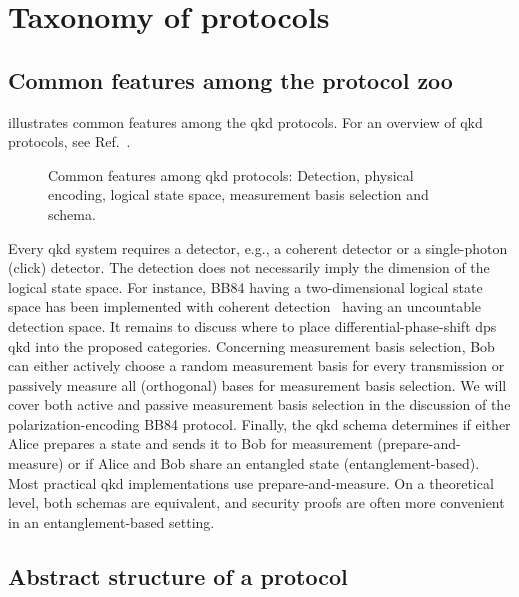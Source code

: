 \section{Taxonomy of protocols}

\subsection{Common features among the protocol zoo}

 illustrates common features among the \gls{qkd} protocols.
For an overview of \gls{qkd} protocols, see Ref.~\cite{Duvsek2006}.
\begin{figure}[htb]
	\centering
	
	\caption{Common features among \gls{qkd} protocols: Detection, physical encoding, logical state space, measurement basis selection and schema.}\label{fig:qkd_classification}
\end{figure}
Every \gls{qkd} system requires a detector, e.g., a coherent detector or a single-photon (click) detector.
The detection does not necessarily imply the dimension of the logical state space.
For instance, BB84 having a two-dimensional logical state space has been implemented with coherent detection~\cite{Qi2021} having an uncountable detection space.
It remains to discuss where to place differential-phase-shift \gls{dps} \gls{qkd} into the proposed categories.
Concerning measurement basis selection, Bob can either actively choose a random measurement basis for every transmission or passively measure all (orthogonal) bases for measurement basis selection.
We will cover both active and passive measurement basis selection in the discussion of the polarization-encoding BB84 protocol.
Finally, the \gls{qkd} schema determines if either Alice prepares a state and sends it to Bob for measurement (prepare-and-measure) or if Alice and Bob share an entangled state (entanglement-based).
Most practical \gls{qkd} implementations use prepare-and-measure.
On a theoretical level, both schemas are equivalent, and security proofs are often more convenient in an entanglement-based setting.

\subsection{Abstract structure of a protocol}

